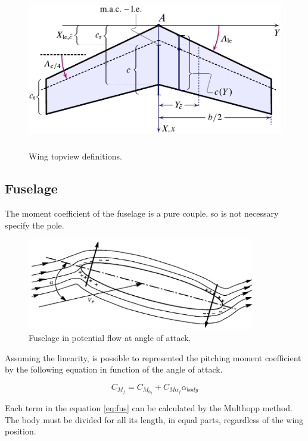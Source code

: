 \begin{figure}[H]
\centering
\includegraphics[height=7cm]{Immagini/wing_topview_1_new}
\caption{Wing topview definitions.}
\label{wing}
\end{figure}




\subsection{Fuselage}
The moment coefficient of the fuselage is a pure couple, so is not necessary specify the pole.


\begin{figure}[H]
\centering
\includegraphics[height=4cm]{Immagini/fuse}
\caption{Fuselage in potential flow at angle of attack.}
\label{fus}
\end{figure}


Assuming the linearity, is possible to represented the pitching moment coefficient by the following equation in function of the angle of attack.

\begin{equation}
C_{M_f}=C_{M_{0_f}}+C_{{M\alpha}_f} \alpha_{body}
\label{eq:fus}
\end{equation}

Each term in the equation \ref{eq:fus} can be calculated by the Multhopp method. %
The body must be divided for all its length, in equal parts, regardless of the wing position.

